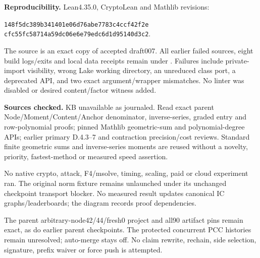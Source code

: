 \documentclass[10pt]{article}
\begin{document}
\textbf{Reproducibility.} Lean4.35.0, CryptoLean and Mathlib revisions:
\begin{center}\small
\texttt{148f5dc389b341401e06d76abe7783c4ccf42f2e}\\
\texttt{cfc55fc58714a59dc06e6e79edc6d1d95140d3c2}.
\end{center}
The source is an exact copy of accepted draft007. All earlier failed sources,
eight build logs/exits and local data receipts remain under
. Failures include private-import visibility,
wrong Lake working directory, an unreduced class port, a deprecated API,
and two exact argument/wrapper mismatches. No linter was disabled or desired
content/factor witness added.

\textbf{Sources checked.} KB unavailable as journaled. Read exact parent
Node/Moment/Content/Anchor denominator, inverse-series, graded entry and
row-polynomial proofs; pinned Mathlib geometric-sum and polynomial-degree
APIs; earlier primary D.4.3--7 and contraction precision/cost reviews.
Standard finite geometric sums and inverse-series moments are reused without
a novelty, priority, fastest-method or measured speed assertion.

No native crypto, attack, F4/msolve, timing, scaling, paid or cloud experiment
ran. The original norm fixture remains unlaunched under its unchanged
checkpoint transport blocker. No measured result updates canonical IC
graphs/leaderboards; the diagram records proof dependencies.

The parent arbitrary-node42/44/fresh0 project and all90 artifact pins remain
exact, as do earlier parent checkpoints. The protected concurrent PCC
histories remain unresolved; auto-merge stays off. No claim rewrite,
rechain, side selection, signature, prefix waiver or force push is attempted.
\end{document}
